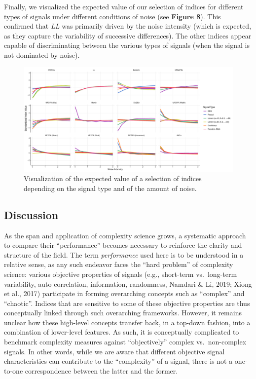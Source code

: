 \documentclass[
  man]{apa6}
\begin{document}
Finally, we visualized the expected value of our selection of indices for different types of signals under different conditions of noise (see \textbf{Figure 8}). This confirmed that \emph{LL} was primarily driven by the noise intensity (which is expected, as they capture the variability of successive differences). The other indices appear capable of discriminating between the various types of signals (when the signal is not dominated by noise).

\begin{figure}
\centering
\includegraphics{./figures/models-1.pdf}
\caption{\label{fig:models}Visualization of the expected value of a selection of indices depending on the signal type and of the amount of noise.}
\end{figure}

\hypertarget{discussion}{%
\subsection{Discussion}\label{discussion}}

As the span and application of complexity science grows, a systematic approach to compare their ``performance'' becomes necessary to reinforce the clarity and structure of the field. The term \emph{performance} used here is to be understood in a relative sense, as any such endeavor faces the ``hard problem'' of complexity science: various objective properties of signals (e.g., short-term vs.~long-term variability, auto-correlation, information, randomness, Namdari \& Li, 2019; Xiong et al., 2017) participate in forming overarching concepts such as ``complex'' and ``chaotic''. Indices that are sensitive to some of these objective properties are thus conceptually linked through such overarching frameworks. However, it remains unclear how these high-level concepts transfer back, in a top-down fashion, into a combination of lower-level features. As such, it is conceptually complicated to benchmark complexity measures against ``objectively'' complex vs.~non-complex signals. In other words, while we are aware that different objective signal characteristics can contribute to the ``complexity'' of a signal, there is not a one-to-one correspondence between the latter and the former.
\end{document}
